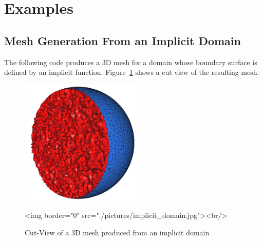 {}
{}
{}



\section{Examples}
\label{Mesh_3_section_examples}


\subsection{Mesh Generation From an Implicit Domain}
The following code produces a 3D mesh for a domain whose boundary surface
is defined by an implicit
function. Figure~\ref{figure:implicit_domain} shows a cut view of the
resulting mesh.


\begin{figure}[ht]
\begin{center}
 \begin{ccTexOnly}
   \includegraphics[height=6cm]{Mesh_3/pictures/implicit_domain}
 \end{ccTexOnly}
 \begin{ccHtmlOnly}
   <img border="0" src="./pictures/implicit_domain.jpg"><br/>
 \end{ccHtmlOnly}
 \caption{Cut-View of a 3D mesh produced from an implicit domain}
  \label{figure:implicit_domain}
\end{center}
\end{figure}


